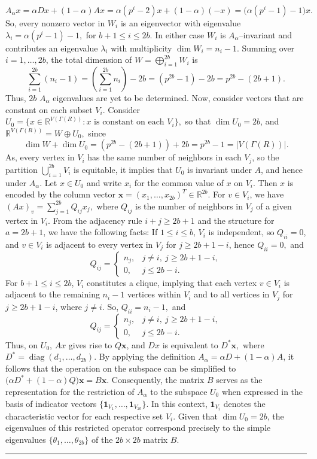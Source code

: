 \documentclass[12pt,twoside]{article}
\renewenvironment{proof}{{\noindent\bfseries Proof.}}{\qed}
\def\qed{\nolinebreak\hfill\rule{.2cm}{.2cm}\par\addvspace{.5cm}}
\begin{document}
\begin{proof}
	\[
	A_\alpha x = \alpha Dx + (1-\alpha)Ax
	= \alpha(p^{ i}-2)x + (1-\alpha)(-x)
	= \bigl(\alpha(p^{ i}-1)-1\bigr)x.
	\]
	So, every nonzero vector in $W_i$ is an eigenvector with eigenvalue $\lambda_i = \alpha(p^{ i}-1)-1,$ for $b+1\le i\le 2b.$
	In either case $W_i$ is $A_\alpha$--invariant and contributes an eigenvalue $\lambda_i$ with
	multiplicity $\dim W_i = n_i-1$.  Summing over $i=1,\dots,2b$, the total dimension of $W= \bigoplus_{i=1}^{2b} W_i$	is
	\[
	\sum_{i=1}^{2b}(n_i-1)
	= \left(\sum_{i=1}^{2b}n_i\right) - 2b
	= (p^{ 2b}-1) - 2b
	= p^{ 2b} - (2b+1).
	\]
	Thus, $2b$ $A_{\alpha}$ eigenvalues are yet to be determined. 	Now, consider vectors that are constant on each subset $V_i$.
	Consider $U_0 = \{x\in\mathbb{R}^{V( \varGamma(R))} : x \text{ is constant on each }V_i\}, $ so that  $\dim U_0 = 2b$, and $\mathbb{R}^{V( \varGamma(R))} = W \oplus U_0,$	since
	\[
	\dim W + \dim U_0 = (p^{ 2b}-(2b+1)) + 2b = p^{ 2b}-1 = |V( \varGamma(R))|.
	\]
	As, every vertex in $V_i$ has the same number of neighbors in each $V_j$, so the partition $\bigcup_{i=1}^{2b}V_{i}$ is equitable, it implies that $U_0$ is invariant under $A$, and hence under $A_\alpha$. 	Let $x\in U_0$ and write $x_i$ for the common value of $x$ on $V_i$. Then $x$ is encoded by the column vector $\mathbf{x} = (x_1,\dots,x_{2b})^T \in \mathbb{R}^{2b}.$ For $v\in V_i$, we have $(Ax)_v = \sum_{j=1}^{2b} Q_{ij} x_j,$ where $Q_{ij}$ is the number of neighbors in $V_j$ of a given vertex in $V_i$. From the adjacency rule $i+j\ge 2b+1$ and the structure for $a=2b+1$, we have the following facts: If $1\le i\le b$, $V_i$ is independent, so $Q_{ii}=0$, and $v\in V_i$ is adjacent to every vertex in $V_j$ for $j\ge 2b+1-i$, hence $Q_{ii} = 0,$ and 
	$$Q_{ij} =
		\begin{cases}
			n_j, & j\ne i,\ j\ge 2b+1-i,\\
			0, & j \le 2b-i.
		\end{cases}$$
		For $b+1\le i\le 2b$, $V_i$ constitutes a clique, implying that each vertex $v\in V_i$ is adjacent to the remaining $n_i-1$ vertices within $V_i$ and to all vertices in $V_j$ for $j\ge 2b+1-i$, where $j\ne i$. So, $Q_{ii} = n_i-1,$ and 
		$$Q_{ij} =
		\begin{cases}
			n_j, & j\ne i,\ j\ge 2b+1-i,\\
			0, & j \le 2b-i.
		\end{cases}$$	
		Thus, on $U_0$, $Ax $ gives rise to $Q\mathbf{x}$, and $Dx$ is equivalent to $D^\ast \mathbf{x},$
	where $D^\ast = \operatorname{diag}(d_1,\dots,d_{2b})$. 
	By applying the definition $A_\alpha = \alpha D + (1-\alpha) A$, it follows that the operation on the subspace can be simplified to $\bigl(\alpha D^\ast + (1-\alpha)Q\bigr)\mathbf{x} = B\mathbf{x}$. Consequently, the matrix $B$ serves as the representation for the restriction of $A_\alpha$ to the subspace $U_0$ when expressed in the basis of indicator vectors $\{\mathbf{1}_{V_1}, \dots, \mathbf{1}_{V_{2b}}\}$. In this context, $\mathbf{1}_{V_i}$ denotes the characteristic vector for each respective set $V_i$. Given that $\dim U_0 = 2b$, the eigenvalues of this restricted operator correspond precisely to the simple eigenvalues $\{\theta_1, \dots, \theta_{2b}\}$ of the $2b \times 2b$ matrix $B$.

\end{proof}
\end{document}
